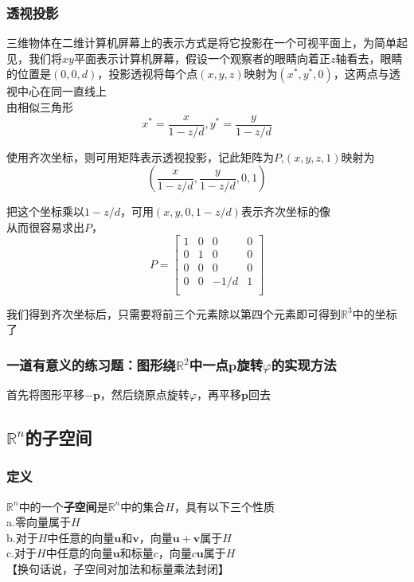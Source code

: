 \documentclass{article}
\newcommand{\ve}{\boldsymbol}
\begin{document}
\begin{CJK}{UTF8}{gkai}
\subsubsection{透视投影}

三维物体在二维计算机屏幕上的表示方式是将它投影在一个可视平面上，为简单起见，我们将$xy$平面表示计算机屏幕，假设一个观察者的眼睛向着正$z$轴看去，眼睛的位置是$(0,0,d)$，投影透视将每个点$(x,y,z)$映射为$(x^*,y^*,0)$，这两点与透视中心在同一直线上\\

由相似三角形
\[x^*=\dfrac{x}{1-z/d},y^*=\dfrac{y}{1-z/d}\]

使用齐次坐标，则可用矩阵表示透视投影，记此矩阵为$P$,$(x,y,z,1)$映射为
\[(\dfrac{x}{1-z/d},\dfrac{y}{1-z/d},0,1)\]

把这个坐标乘以$1-z/d$，可用$(x,y,0,1-z/d)$表示齐次坐标的像\\

从而很容易求出$P$，
\[P=\begin{bmatrix}
    1&0&0&0\\
    0&1&0&0\\
    0&0&0&0\\
    0&0&-1/d&1\\
\end{bmatrix}\]

我们得到齐次坐标后，只需要将前三个元素除以第四个元素即可得到$\mathbb{R}^3$中的坐标了\\

\subsubsection{一道有意义的练习题：图形绕$\mathbb{R}^2$中一点$\ve{p}$旋转$\varphi$的实现方法}

首先将图形平移$-\ve{p}$，然后绕原点旋转$\varphi$，再平移$\ve{p}$回去\\
\subsection{$\mathbb{R}^n$的子空间}
\subsubsection{定义}
$\mathbb{R}^n$中的一个\textbf{子空间}是$\mathbb{R}^n$中的集合$H$，具有以下三个性质\\
a.零向量属于$H$\\
b.对于$H$中任意的向量$\ve{u}$和$\ve{v}$，向量$\ve{u}+\ve{v}$属于$H$\\
c.对于$H$中任意的向量$\ve{u}$和标量$c$，向量$c\ve{u}$属于$H$\\
【换句话说，子空间对加法和标量乘法封闭】\\


\end{CJK}
\end{document}

